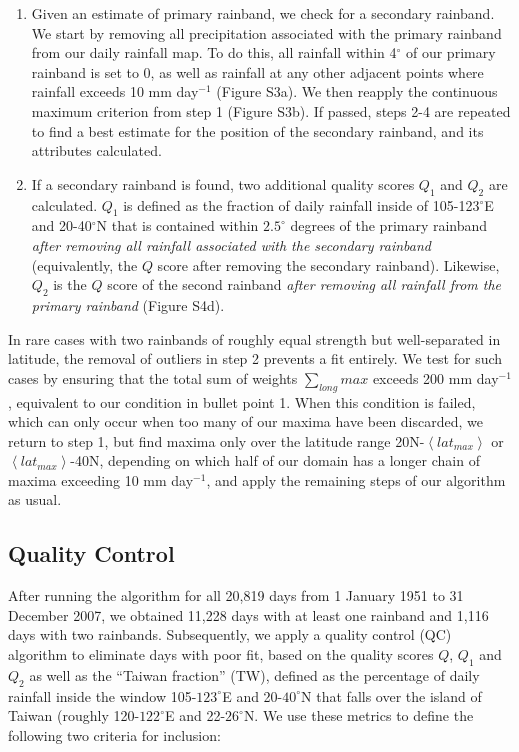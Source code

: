 \begin{enumerate}
	\item Given an estimate of primary rainband, we check for a secondary rainband. We start by removing all precipitation associated with the primary rainband from our daily rainfall map. To do this, all rainfall within 4$^{\circ}$ of our primary rainband is set to 0, as well as rainfall at any other adjacent points where rainfall exceeds 10 mm day$^{-1}$ (Figure S3a). We then reapply the continuous maximum criterion from step 1 (Figure S3b). If passed, steps 2-4 are repeated to find a best estimate for the position of the secondary rainband, and its attributes calculated.
	
	\item If a secondary rainband is found, two additional quality scores $Q_1$ and $Q_2$ are calculated. $Q_1$ is defined as the fraction of daily rainfall inside of 105-123$^{\circ}$E and 20-40$^{\circ}$N that is contained within $2.5^{\circ}$ degrees of the primary rainband \textit{after removing all rainfall associated with the secondary rainband} (equivalently, the $Q$ score after removing the secondary rainband). Likewise, $Q_2$ is the $Q$ score of the second rainband \textit{after removing all rainfall from the primary rainband} (Figure S4d).		
	
\end{enumerate} 

In rare cases with two rainbands of roughly equal strength but well-separated in latitude, the removal of outliers in step 2 prevents a fit entirely. We test for such cases by ensuring that the total sum of weights ${\sum_{long} max}$ exceeds 200 mm day$^{-1}$, equivalent to our condition in bullet point 1. When this condition is failed, which can only occur when too many of our maxima have been discarded, we return to step 1, but find maxima only over the latitude range 20N-$\left<lat_{max}\right>$ or $\left<lat_{max}\right>$-40N, depending on which half of our domain has a longer chain of maxima exceeding 10 mm day$^{-1}$, and apply the remaining steps of our algorithm as usual.

\subsection{Quality Control}

After running the algorithm for all 20,819 days from 1 January 1951 to 31 December 2007, we obtained 11,228 days with at least one rainband and 1,116 days with two rainbands. Subsequently, we apply a quality control (QC) algorithm to eliminate days with poor fit, based on the quality scores $Q$, $Q_1$ and $Q_2$ as well as the ``Taiwan fraction'' (TW), defined as the percentage of daily rainfall inside the window 105-$123^{\circ}$E and 20-$40^{\circ}$N that falls over the island of Taiwan (roughly 120-$122^{\circ}$E and 22-$26^{\circ}$N. We use these metrics to define the following two criteria for inclusion:

